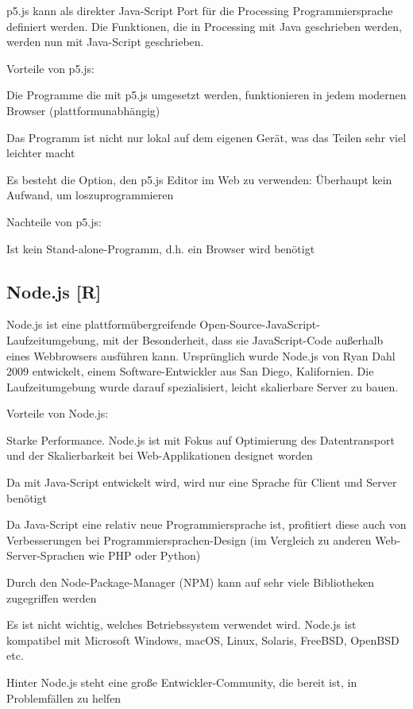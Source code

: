 p5.js kann als direkter Java-Script Port für die Processing Programmiersprache definiert werden. Die Funktionen, die in Processing mit Java geschrieben werden, werden nun mit Java-Script geschrieben.

Vorteile von p5.js:
\begin{compactitem}
    \item Die Programme die mit p5.js umgesetzt werden, funktionieren in jedem modernen Browser (plattformunabhängig)
    \item Das Programm ist nicht nur lokal auf dem eigenen Gerät, was das Teilen sehr viel leichter macht
    \item Es besteht die Option, den p5.js Editor im Web zu verwenden: Überhaupt kein Aufwand, um loszuprogrammieren
\end{compactitem}

Nachteile von p5.js:
\begin{compactitem}
    \item Ist kein Stand-alone-Programm, d.h. ein Browser wird benötigt
\end{compactitem}

\subsection {Node.js [R]}
Node.js ist eine plattformübergreifende Open-Source-JavaScript-Laufzeitumgebung, mit der Besonderheit, dass sie JavaScript-Code außerhalb eines Webbrowsers ausführen kann.
Ursprünglich wurde Node.js von Ryan Dahl 2009 entwickelt, einem Software-Entwickler aus San Diego, Kalifornien.
Die Laufzeitumgebung wurde darauf spezialisiert, leicht skalierbare Server zu bauen.

Vorteile von Node.js:

\begin{compactitem}
    \item Starke Performance. Node.js ist mit Fokus auf Optimierung des Datentransport und der Skalierbarkeit bei Web-Applikationen designet worden
    \item Da mit Java-Script entwickelt wird, wird nur eine Sprache für Client und Server benötigt
    \item Da Java-Script eine relativ neue Programmiersprache ist, profitiert diese auch von Verbesserungen bei Programmiersprachen-Design (im Vergleich zu anderen Web-Server-Sprachen wie PHP oder Python)
    \item Durch den Node-Package-Manager (NPM) kann auf sehr viele Bibliotheken zugegriffen werden
    \item Es ist nicht wichtig, welches Betriebssystem verwendet wird. Node.js ist kompatibel mit Microsoft Windows, macOS, Linux, Solaris, FreeBSD, OpenBSD etc.
    \item Hinter Node.js steht eine große Entwickler-Community, die bereit ist, in Problemfällen zu helfen
\end{compactitem}


